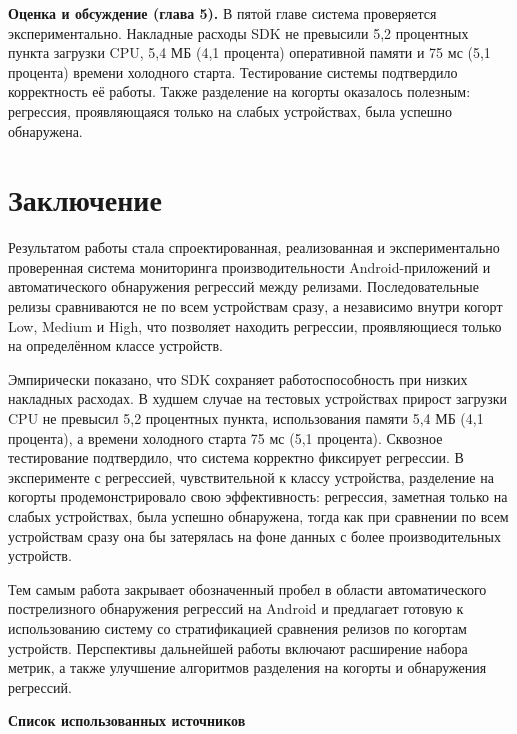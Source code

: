 \documentclass[14pt,a4paper]{extarticle}
\begin{document}
\noindent\textbf{Оценка и обсуждение (глава 5).} В пятой главе система проверяется экспериментально. Накладные расходы SDK не превысили 5,2 процентных пункта загрузки CPU, 5,4 МБ (4,1 процента) оперативной памяти и 75 мс (5,1 процента) времени холодного старта. Тестирование системы подтвердило корректность её работы. Также разделение на когорты оказалось полезным: регрессия, проявляющаяся только на слабых устройствах, была успешно обнаружена.

\newpage

\section*{Заключение}

Результатом работы стала спроектированная, реализованная и экспериментально проверенная система мониторинга производительности Android-приложений и автоматического обнаружения регрессий между релизами. Последовательные релизы сравниваются не по всем устройствам сразу, а независимо внутри когорт Low, Medium и High, что позволяет находить регрессии, проявляющиеся только на определённом классе устройств.

Эмпирически показано, что SDK сохраняет работоспособность при низких накладных расходах. В худшем случае на тестовых устройствах прирост загрузки CPU не превысил 5,2 процентных пункта, использования памяти 5,4 МБ (4,1 процента), а времени холодного старта 75 мс (5,1 процента). Сквозное тестирование подтвердило, что система корректно фиксирует регрессии. В эксперименте с регрессией, чувствительной к классу устройства, разделение на когорты продемонстрировало свою эффективность: регрессия, заметная только на слабых устройствах, была успешно обнаружена, тогда как при сравнении по всем устройствам сразу она бы затерялась на фоне данных с более производительных устройств.

Тем самым работа закрывает обозначенный пробел в области автоматического пострелизного обнаружения регрессий на Android и предлагает готовую к использованию систему со стратификацией сравнения релизов по когортам устройств. Перспективы дальнейшей работы включают расширение набора метрик, а также улучшение алгоритмов разделения на когорты и обнаружения регрессий.

\newpage

\begin{center}
\textbf{\large Список использованных источников}
\end{center}
\vspace{0.4cm}
\nocite{FirebasePerf,Kayenta,Nguyen2012,FBDetect,Zikan,schulze2024clickhouse}
\printbibliography[heading=none]
\end{document}
